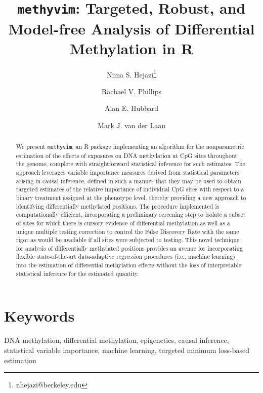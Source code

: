 \documentclass[9pt,a4paper,]{extarticle}
\theoremstyle{definition}
\theoremstyle{definition}
\theoremstyle{definition}
\theoremstyle{remark}
\begin{document}
\pagestyle{front}

\title{\texttt{methyvim}: Targeted, Robust, and Model-free Analysis of Differential Methylation in R}

\author[1,2]{Nima S. Hejazi\thanks{\ttfamily nhejazi@berkeley.edu}}
\author[1]{Rachael V. Phillips}
\author[1]{Alan E. Hubbard}
\author[1,3]{Mark J. van der Laan}

\maketitle
\thispagestyle{front}

\begin{abstract}
We present \texttt{methyvim}, an R package implementing an algorithm for the
nonparametric estimation of the effects of exposures on DNA methylation at CpG
sites throughout the genome, complete with straightforward statistical
inference for such estimates. The approach leverages variable importance
measures derived from statistical parameters arising in causal inference,
defined in such a manner that they may be used to obtain targeted estimates of
the relative importance of individual CpG sites with respect to a binary
treatment assigned at the phenotype level, thereby providing a new approach to
identifying differentially methylated positions. The procedure implemented is
computationally efficient, incorporating a preliminary screening step to
isolate a subset of sites for which there is cursory evidence of differential
methylation as well as a unique multiple testing correction to control the
False Discovery Rate with the same rigor as would be available if all sites
were subjected to testing. This novel technique for analysis of differentially
methylated positions provides an avenue for incorporating flexible
state-of-the-art data-adaptive regression procedures (i.e., machine learning)
into the estimation of differential methylation effects without the loss of
interpretable statistical inference for the estimated quantity.
\end{abstract}

\section*{Keywords}
DNA methylation, differential methylation, epigenetics, causal inference, statistical variable importance, machine learning, targeted minimum loss-based estimation
\end{document}
